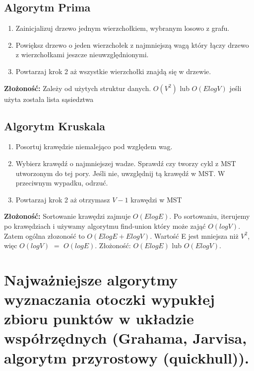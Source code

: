 \documentclass[12pt]{article}
\begin{document}
    
    \subsection{Algorytm Prima}
    \begin{enumerate}
        \item Zainicjalizuj drzewo jednym wierzchołkiem, wybranym losowo z grafu.
        \item Powiększ drzewo o jeden wierzchołek z najmniejszą wagą który łączy drzewo z wierzchołkami jeszcze nieuwzględnionymi.
        \item Powtarzaj krok 2 aż wszystkie wierzchołki znajdą się w drzewie.
    \end{enumerate}
    \textbf{Złożoność:} Zależy od użytych struktur danych. $O(V^2)$ lub $O(ElogV)$ jeśli użyta została lista sąsiedztwa
    
    
     
    \subsection{Algorytm Kruskala}

    \begin{enumerate}
        \item Posortuj krawędzie niemalejąco pod względem wag.
        \item Wybierz krawędź o najmniejszej wadze. Sprawdź czy tworzy cykl z MST utworzonym do tej pory. Jeśli nie, uwzględnij tą krawędź w MST. W przeciwnym wypadku, odrzuć.
        \item Powtarzaj krok 2 aż otrzymasz $V-1$ krawędzi w MST
    \end{enumerate}
        
    \textbf{Złożoność:} Sortowanie krawędzi zajmuje $O(ElogE)$. Po sortowaniu, iterujemy po krawędziach i używamy algorytmu find-union który może zająć $O(logV)$. Zatem ogólna złozoność to $O(ElogE+ElogV)$. Wartość E jest mniejsza niż $V^2$, więc $O(logV)$ $=$ $O(logE)$. Złożoność: $O(ElogE)$ lub $O(ElogV)$. 

    \newpage

    \section{Najważniejsze algorytmy wyznaczania otoczki wypukłej zbioru punktów w układzie współrzędnych (Grahama, Jarvisa, algorytm przyrostowy (quickhull)).}
\end{document}
